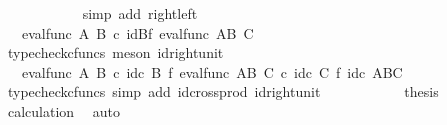 \begin{isabellebody}
\ \ \ \ \ \ \ \ \ \ \isamarkupfalse%
\ {\isacharparenleft}{\kern0pt}simp\ add{\isacharcolon}{\kern0pt}\ right{\isacharunderscore}{\kern0pt}left{\isacharparenright}{\kern0pt}\isanewline
\ \ \ \ \ \ \ \ \isamarkupfalse%
\ \isamarkupfalse%
\ {\isachardoublequoteopen}{\isachardot}{\kern0pt}{\isachardot}{\kern0pt}{\isachardot}{\kern0pt}\ {\isacharequal}{\kern0pt}\ {\isacharparenleft}{\kern0pt}eval{\isacharunderscore}{\kern0pt}func\ A\ B{\isacharparenright}{\kern0pt}\ {\isasymcirc}\isactrlsub c\ {\isacharparenleft}{\kern0pt}id{\isacharparenleft}{\kern0pt}B{\isacharparenright}{\kern0pt}{\isasymtimes}\isactrlsub f\ eval{\isacharunderscore}{\kern0pt}func\ {\isacharparenleft}{\kern0pt}A\isactrlbsup B\isactrlesup {\isacharparenright}{\kern0pt}\ C{\isacharparenright}{\kern0pt}{\isachardoublequoteclose}\isanewline
\ \ \ \ \ \ \ \ \ \ \isamarkupfalse%
\ {\isacharparenleft}{\kern0pt}typecheck{\isacharunderscore}{\kern0pt}cfuncs{\isacharcomma}{\kern0pt}\ meson\ id{\isacharunderscore}{\kern0pt}right{\isacharunderscore}{\kern0pt}unit{}{\isacharparenright}{\kern0pt}\isanewline
\ \ \ \ \ \ \ \ \isamarkupfalse%
\ \isamarkupfalse%
\ {\isachardoublequoteopen}{\isachardot}{\kern0pt}{\isachardot}{\kern0pt}{\isachardot}{\kern0pt}\ {\isacharequal}{\kern0pt}\ eval{\isacharunderscore}{\kern0pt}func\ A\ B\ {\isasymcirc}\isactrlsub c\ id\isactrlsub c\ B\ {\isasymtimes}\isactrlsub f\ eval{\isacharunderscore}{\kern0pt}func\ {\isacharparenleft}{\kern0pt}A\isactrlbsup B\isactrlesup {\isacharparenright}{\kern0pt}\ C\ {\isasymcirc}\isactrlsub c\ id\isactrlsub c\ C\ {\isasymtimes}\isactrlsub f\ id\isactrlsub c\ {\isacharparenleft}{\kern0pt}A\isactrlbsup B\isactrlesup \isactrlbsup C\isactrlesup {\isacharparenright}{\kern0pt}{\isachardoublequoteclose}\isanewline
\ \ \ \ \ \ \ \ \ \ \isamarkupfalse%
\ {\isacharparenleft}{\kern0pt}typecheck{\isacharunderscore}{\kern0pt}cfuncs{\isacharcomma}{\kern0pt}\ simp\ add{\isacharcolon}{\kern0pt}\ id{\isacharunderscore}{\kern0pt}cross{\isacharunderscore}{\kern0pt}prod\ id{\isacharunderscore}{\kern0pt}right{\isacharunderscore}{\kern0pt}unit{}{\isacharparenright}{\kern0pt}\isanewline
\ \ \ \ \ \ \ \ \isamarkupfalse%
\ \isamarkupfalse%
\ {\isacharquery}{\kern0pt}thesis\ \isamarkupfalse%
\ calculation\ \isamarkupfalse%
\ auto\isanewline
\ \ \ \ \ \ \isamarkupfalse%
\isanewline
\ \ \ \ \isamarkupfalse%
\isanewline
\ \ \isamarkupfalse%

\end{isabellebody}
